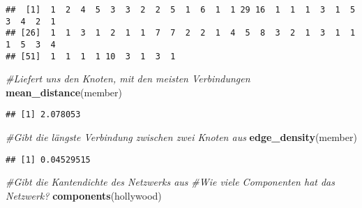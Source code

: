 \documentclass[
]{article}
\newenvironment{Shaded}{\begin{snugshade}}{\end{snugshade}}
\newcommand{\CommentTok}[1]{\textcolor[rgb]{0.56,0.35,0.01}{\textit{#1}}}
\newcommand{\KeywordTok}[1]{\textcolor[rgb]{0.13,0.29,0.53}{\textbf{#1}}}
\newcommand{\NormalTok}[1]{#1}
\begin{document}
\begin{verbatim}
##  [1]  1  2  4  5  3  3  2  2  5  1  6  1  1 29 16  1  1  1  3  1  5  3  4  2  1
## [26]  1  1  3  1  2  1  1  7  7  2  2  1  4  5  8  3  2  1  3  1  1  1  5  3  4
## [51]  1  1  1  1 10  3  1  3  1
\end{verbatim}

\begin{Shaded}
\begin{Highlighting}[]
\CommentTok{#Liefert uns den Knoten, mit den meisten Verbindungen}
\KeywordTok{mean_distance}\NormalTok{(member)}
\end{Highlighting}
\end{Shaded}

\begin{verbatim}
## [1] 2.078053
\end{verbatim}

\begin{Shaded}
\begin{Highlighting}[]
\CommentTok{#Gibt die längste Verbindung zwischen zwei Knoten aus}
\KeywordTok{edge_density}\NormalTok{(member)}
\end{Highlighting}
\end{Shaded}

\begin{verbatim}
## [1] 0.04529515
\end{verbatim}

\begin{Shaded}
\begin{Highlighting}[]
\CommentTok{#Gibt die Kantendichte des Netzwerks aus}
\CommentTok{#Wie    viele   Componenten hat das Netzwerk?}
\KeywordTok{components}\NormalTok{(hollywood)}
\end{Highlighting}
\end{Shaded}
\end{document}
